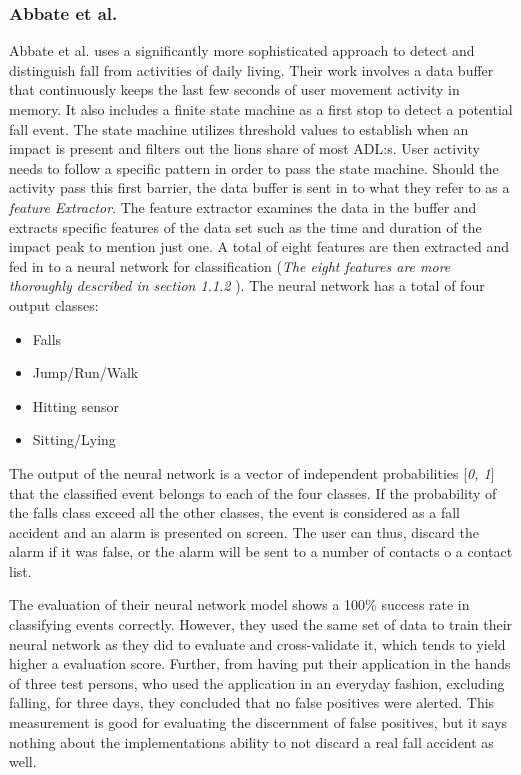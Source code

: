 \documentclass[12pt, a4paper, onecolumn]{article}
\begin{document}
	
	\subsubsection{Abbate et al.}
	Abbate et al. uses a significantly more sophisticated approach to detect and distinguish fall from activities of daily living. Their work involves a data buffer that continuously keeps the last few seconds of user movement activity in memory. It also includes a finite state machine as a first stop to detect a potential fall event. The state machine utilizes threshold values to establish when an impact is present and filters out the lions share of most ADL:s. User activity needs to follow a specific pattern in order to pass the state machine. Should the activity pass this first barrier, the data buffer is sent in to what they refer to as a \textit{feature Extractor}. The feature extractor examines the data in the buffer and extracts specific features of the data set such as the time and duration of the impact peak to mention just one. A total of eight features are then extracted and fed in to a neural network for classification  (\textit{The eight features are more thoroughly described in section 1.1.2 }). The neural network has a total of four output classes:

	\begin{itemize}
		\item Falls
		\item Jump/Run/Walk
		\item Hitting sensor
		\item Sitting/Lying
	\end{itemize}

	The output of the neural network is a vector of independent probabilities [\textit{0, 1}] that the classified event belongs to each of the four classes. If the probability of the falls class exceed all the other classes, the event is considered as a fall accident and an alarm is presented on screen. The user can thus, discard the alarm if it was false, or the alarm will be sent to a number of contacts o a contact list. 

	The evaluation of their neural network model shows a 100\% success rate in classifying events correctly. However, they used the same set of data to train their neural network as they did to evaluate and cross-validate it, which tends to yield higher a evaluation score. Further, from having put their application in the hands of three test persons, who used the application in an everyday fashion, excluding falling, for three days, they concluded that no false positives were alerted. This measurement is good for evaluating the discernment of false positives, but it says nothing about the implementations ability to not discard a real fall accident as well. 
	
\end{document}
